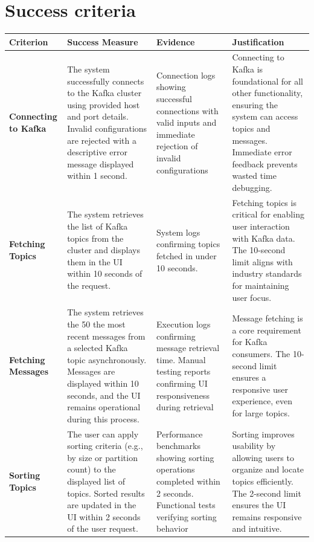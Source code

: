 \documentclass[10pt , a4paper]{report}
\begin{document}
\newpage
\section{Success criteria}

\begin{table}[h!tbp]
\centering
\renewcommand{\arraystretch}{1.3} %
\begin{adjustbox}{max width=\textwidth}
\begin{tabular}{|p{3.5cm}|p{6.5cm}|p{4.5cm}|p{4cm}|}
\hline
\textbf{Criterion} & \textbf{Success Measure} & \textbf{Evidence} & \textbf{Justification} \\ \hline

\textbf{Connecting to Kafka} & 
The system successfully connects to the Kafka cluster using provided host and port details. Invalid configurations are rejected with a descriptive error message displayed within 1 second. & 
Connection logs showing successful connections with valid inputs and immediate rejection of invalid configurations & 
Connecting to Kafka is foundational for all other functionality, ensuring the system can access topics and messages. Immediate error feedback prevents wasted time debugging. \\ \hline

\textbf{Fetching Topics} & 
The system retrieves the list of Kafka topics from the cluster and displays them in the UI within 10 seconds of the request. & 
System logs confirming topics fetched in under 10 seconds. & 
Fetching topics is critical for enabling user interaction with Kafka data. The 10-second limit aligns with industry standards for maintaining user focus. \\ \hline

\textbf{Fetching Messages} & 
The system retrieves the 50 the most recent messages from a selected Kafka topic asynchronously. Messages are displayed within 10 seconds, and the UI remains operational during this process. & 
Execution logs confirming message retrieval time. Manual testing reports confirming UI responsiveness during retrieval & 
Message fetching is a core requirement for Kafka consumers. The 10-second limit ensures a responsive user experience, even for large topics. \\ \hline

\textbf{Sorting Topics} & 
The user can apply sorting criteria (e.g., by size or partition count) to the displayed list of topics. Sorted results are updated in the UI within 2 seconds of the user request. & 
Performance benchmarks showing sorting operations completed within 2 seconds. Functional tests verifying sorting behavior & 
Sorting improves usability by allowing users to organize and locate topics efficiently. The 2-second limit ensures the UI remains responsive and intuitive. \\ \hline


\end{tabular}
\end{adjustbox}
\end{table}
\end{document}
